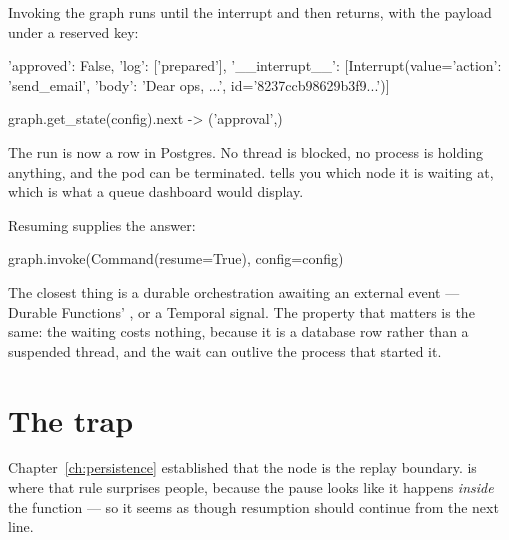 Invoking the graph runs until the interrupt and then returns, with the payload
under a reserved key:

\begin{console}
{'approved': False, 'log': ['prepared'],
 '__interrupt__': [Interrupt(value={'action': 'send_email',
                                    'body': 'Dear ops, ...'},
                             id='8237ccb98629b3f9...')]}

graph.get_state(config).next  ->  ('approval',)
\end{console}

The run is now a row in Postgres. No thread is blocked, no process is holding
anything, and the pod can be terminated.  tells you
which node it is waiting at, which is what a queue dashboard would display.

Resuming supplies the answer:

\begin{python}[caption={Answering, possibly days later, on a different pod}, label={lst:resume}]
graph.invoke(Command(resume=True), config=config)
\end{python}

\begin{console}
['prepared', 'decision=True', 'done']
\end{console}


\begin{dotnetbox}
The closest thing is a durable orchestration awaiting an external event ---
Durable Functions' , or a Temporal signal. The
property that matters is the same: the waiting costs nothing, because it is a
database row rather than a suspended thread, and the wait can outlive the process
that started it.
\end{dotnetbox}

\section{The trap}
\label{sec:interrupt-trap}

Chapter~\ref{ch:persistence} established that the node is the replay boundary.
 is where that rule surprises people, because the pause looks like
it happens \emph{inside} the function --- so it seems as though resumption should
continue from the next line.

